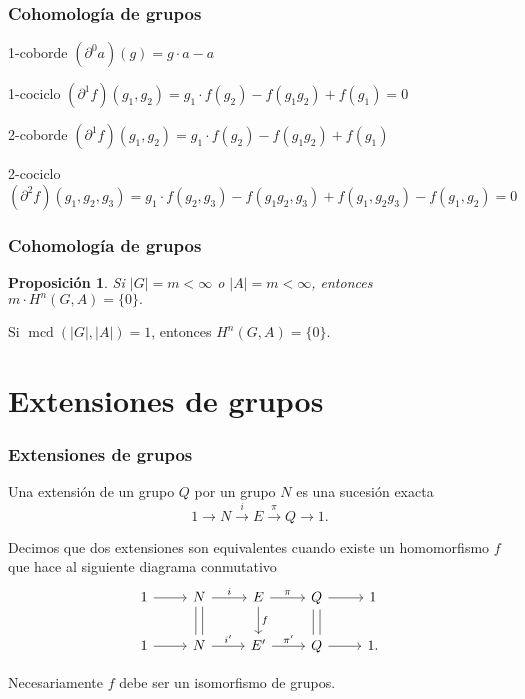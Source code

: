 \documentclass[
	11pt, %
]{beamer}
\DeclareMathOperator{\mcd}{mcd}
\newcommand{\ord}[1]{\left|#1\right|}%
\newcommand{\extension}[5]{1\xrightarrow{} #3 \xrightarrow{#1} #4\xrightarrow{#2} #5 \xrightarrow{} 1}
\newtheorem{proposition}{Proposici\'on}
\begin{document}
\begin{frame}
	\frametitle{Cohomología de grupos}
	
	\begin{exampleblock}{1-coborde}
		 \centering$(\partial^0 a)(g) = g\cdot a - a$
	\end{exampleblock}
	\begin{exampleblock}{1-cociclo}
		 \centering$(\partial^1 f)(g_1,g_2) = g_1\cdot f(g_2) - f(g_1g_2) + f(g_1) = 0$
	\end{exampleblock}
	\begin{exampleblock}{2-coborde}
		 \centering$(\partial^1 f)(g_1,g_2) = g_1\cdot f(g_2) - f(g_1g_2) + f(g_1)$
	\end{exampleblock}
	\begin{exampleblock}{2-cociclo}
		 \centering$(\partial^2 f)(g_1,g_2,g_3) = g_1\cdot f(g_2,g_3) - f(g_1g_2,g_3) + f(g_1,g_2g_3) - f(g_1,g_2)=0$
	\end{exampleblock}
	
\end{frame}

\begin{frame}
	\frametitle{Cohomología de grupos}
	
	\begin{proposition}
		Si $\ord{G} = m<\infty$ o $\ord{A} = m<\infty$, entonces $m\cdot H^{n}(G,A) = \{0\}.$
	\end{proposition}
	
	\begin{theorem}
		Si $\mcd(\ord{G},\ord{A}) = 1$, entonces $H^{n}(G,A) = \{0\}.$
	\end{theorem}
\end{frame}


\section{Extensiones de grupos}

\begin{frame}[fragile]
	\frametitle{Extensiones de grupos}
	
	Una extensión de un grupo $Q$ por un grupo $N$ es una sucesión exacta $$\extension i \pi N E Q.$$
	
	Decimos que dos extensiones son equivalentes cuando existe un homomorfismo $f$ que hace al siguiente diagrama conmutativo
	\[\begin{tikzcd}
		1 & N & E & Q & 1 \\
		1 & N & {E'} & Q & 1.
		\arrow[from=1-1, to=1-2]
		\arrow["i", from=1-2, to=1-3]
		\arrow["\pi", from=1-3, to=1-4]
		\arrow[from=1-4, to=1-5]
		\arrow[from=2-1, to=2-2]
		\arrow["{i'}", from=2-2, to=2-3]
		\arrow["{\pi'}", from=2-3, to=2-4]
		\arrow[from=2-4, to=2-5]
		\arrow[shift left=1, no head, from=1-4, to=2-4]
		\arrow[shift left=1, no head, from=2-4, to=1-4]
		\arrow["f", from=1-3, to=2-3]
		\arrow[shift left=1, no head, from=1-2, to=2-2]
		\arrow[shift left=1, no head, from=2-2, to=1-2]
	\end{tikzcd}\]
	
	Necesariamente $f$ debe ser un isomorfismo de grupos.
	
\end{frame}
\end{document}
